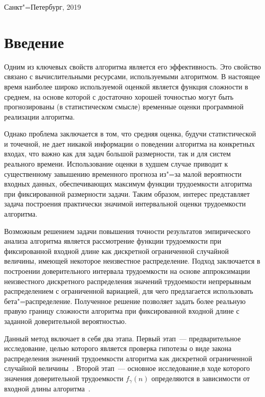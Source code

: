 \documentclass[a4paper,fontsize=14pt]{article}
\begin{document}
\begin{center} Санкт"=Петербург, 2019 \end{center}
\thispagestyle{empty} %


\newpage

\tableofcontents

\newpage

\section{Введение} \label{sec:introduction}

Одним из ключевых свойств алгоритма является его эффективность. Это свойство связано с вычислительными ресурсами, используемыми алгоритмом. В настоящее время наиболее широко используемой оценкой является функция сложности в среднем, на основе которой с достаточно хорошей точностью могут быть прогнозированы (в статистическом смысле) временные оценки программной реализации алгоритма.

Однако проблема заключается в том, что средняя оценка, будучи статистической и точечной, не дает никакой информации о поведении алгоритма на конкретных входах, что важно как для задач большой размерности, так и для систем реального времени. Использование оценки в худшем случае приводит к существенному завышению временного прогноза из"=за малой вероятности входных данных, обеспечивающих максимум функции трудоемкости алгоритма при фиксированной размерности задачи. Таким образом, интерес представляет задача построения практически значимой интервальной оценки трудоемкости алгоритма.

Возможным решением задачи повышения точности результатов эмпирического анализа алгоритма является рассмотрение функции трудоемкости при фиксированной входной длине как дискретной ограниченной случайной величины, имеющей некоторое неизвестное распределение. Подход заключается в построении доверительного интервала трудоемкости на основе аппроксимации неизвестного дискретного распределения значений трудоемкости непрерывным распределением с ограниченной вариацией, для чего предлагается использовать бета"=распределение. Полученное решение позволяет задать более реальную правую границу сложности алгоритма при фиксированной входной длине с заданной доверительной вероятностью.

Данный метод включает в себя два этапа. Первый этап~--- предварительное исследование, целью которого является проверка гипотезы о виде закона распределения значений трудоемкости алгоритма как дискретной ограниченной случайной величины~\cite{petrushyn_ulyanov_planning}. Второй этап~--- основное исследование,в ходе которого значения доверительной трудоемкости $f_\gamma(n)$ определяются в зависимости от входной длины алгоритма~\cite{petrushyn_ulyanov_analysis}.
\end{document}
